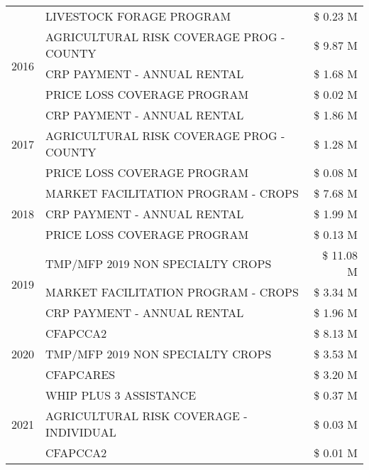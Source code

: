 \begin{tabular}{llr}
 & LIVESTOCK FORAGE PROGRAM & \$ 0.23 M \\
\cline{1-3}
\multirow[t]{3}{*}{2016} & AGRICULTURAL RISK COVERAGE PROG - COUNTY      & \$ 9.87 M \\
 & CRP PAYMENT - ANNUAL RENTAL                   & \$ 1.68 M \\
 & PRICE LOSS COVERAGE PROGRAM                   & \$ 0.02 M \\
\cline{1-3}
\multirow[t]{3}{*}{2017} & CRP PAYMENT - ANNUAL RENTAL & \$ 1.86 M \\
 & AGRICULTURAL RISK COVERAGE PROG - COUNTY & \$ 1.28 M \\
 & PRICE LOSS COVERAGE PROGRAM & \$ 0.08 M \\
\cline{1-3}
\multirow[t]{3}{*}{2018} & MARKET FACILITATION PROGRAM - CROPS & \$ 7.68 M \\
 & CRP PAYMENT - ANNUAL RENTAL & \$ 1.99 M \\
 & PRICE LOSS COVERAGE PROGRAM & \$ 0.13 M \\
\cline{1-3}
\multirow[t]{3}{*}{2019} & TMP/MFP 2019 NON SPECIALTY CROPS & \$ 11.08 M \\
 & MARKET FACILITATION PROGRAM - CROPS & \$ 3.34 M \\
 & CRP PAYMENT - ANNUAL RENTAL & \$ 1.96 M \\
\cline{1-3}
\multirow[t]{3}{*}{2020} & CFAPCCA2 & \$ 8.13 M \\
 & TMP/MFP 2019 NON SPECIALTY CROPS & \$ 3.53 M \\
 & CFAPCARES & \$ 3.20 M \\
\cline{1-3}
\multirow[t]{3}{*}{2021} & WHIP PLUS 3 ASSISTANCE & \$ 0.37 M \\
 & AGRICULTURAL RISK COVERAGE - INDIVIDUAL & \$ 0.03 M \\
 & CFAPCCA2 & \$ 0.01 M \\
\cline{1-3}
\bottomrule
\end{tabular}
